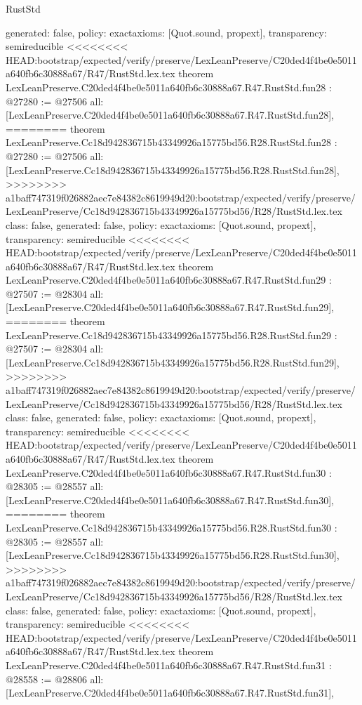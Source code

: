 \begin{lexlean}{RustStd}
\begin{coremodule}
{\begin{coremodule}
{{{{{{{{{{{{{{{{{{{{{{{{{{{{{{{  generated: false,
  policy: exact{axioms: [Quot.sound, propext]},
  transparency: semireducible
}
<<<<<<<< HEAD:bootstrap/expected/verify/preserve/LexLeanPreserve/C20ded4f4be0e5011a640fb6c30888a67/R47/RustStd.lex.tex
theorem LexLeanPreserve.C20ded4f4be0e5011a640fb6c30888a67.R47.RustStd.fun28 : @27280 := @27506 {
  all: [LexLeanPreserve.C20ded4f4be0e5011a640fb6c30888a67.R47.RustStd.fun28],
========
theorem LexLeanPreserve.Cc18d942836715b43349926a15775bd56.R28.RustStd.fun28 : @27280 := @27506 {
  all: [LexLeanPreserve.Cc18d942836715b43349926a15775bd56.R28.RustStd.fun28],
>>>>>>>> a1baff747319f026882aec7e84382c8619949d20:bootstrap/expected/verify/preserve/LexLeanPreserve/Cc18d942836715b43349926a15775bd56/R28/RustStd.lex.tex
  class: false,
  generated: false,
  policy: exact{axioms: [Quot.sound, propext]},
  transparency: semireducible
}
<<<<<<<< HEAD:bootstrap/expected/verify/preserve/LexLeanPreserve/C20ded4f4be0e5011a640fb6c30888a67/R47/RustStd.lex.tex
theorem LexLeanPreserve.C20ded4f4be0e5011a640fb6c30888a67.R47.RustStd.fun29 : @27507 := @28304 {
  all: [LexLeanPreserve.C20ded4f4be0e5011a640fb6c30888a67.R47.RustStd.fun29],
========
theorem LexLeanPreserve.Cc18d942836715b43349926a15775bd56.R28.RustStd.fun29 : @27507 := @28304 {
  all: [LexLeanPreserve.Cc18d942836715b43349926a15775bd56.R28.RustStd.fun29],
>>>>>>>> a1baff747319f026882aec7e84382c8619949d20:bootstrap/expected/verify/preserve/LexLeanPreserve/Cc18d942836715b43349926a15775bd56/R28/RustStd.lex.tex
  class: false,
  generated: false,
  policy: exact{axioms: [Quot.sound, propext]},
  transparency: semireducible
}
<<<<<<<< HEAD:bootstrap/expected/verify/preserve/LexLeanPreserve/C20ded4f4be0e5011a640fb6c30888a67/R47/RustStd.lex.tex
theorem LexLeanPreserve.C20ded4f4be0e5011a640fb6c30888a67.R47.RustStd.fun30 : @28305 := @28557 {
  all: [LexLeanPreserve.C20ded4f4be0e5011a640fb6c30888a67.R47.RustStd.fun30],
========
theorem LexLeanPreserve.Cc18d942836715b43349926a15775bd56.R28.RustStd.fun30 : @28305 := @28557 {
  all: [LexLeanPreserve.Cc18d942836715b43349926a15775bd56.R28.RustStd.fun30],
>>>>>>>> a1baff747319f026882aec7e84382c8619949d20:bootstrap/expected/verify/preserve/LexLeanPreserve/Cc18d942836715b43349926a15775bd56/R28/RustStd.lex.tex
  class: false,
  generated: false,
  policy: exact{axioms: [Quot.sound, propext]},
  transparency: semireducible
}
<<<<<<<< HEAD:bootstrap/expected/verify/preserve/LexLeanPreserve/C20ded4f4be0e5011a640fb6c30888a67/R47/RustStd.lex.tex
theorem LexLeanPreserve.C20ded4f4be0e5011a640fb6c30888a67.R47.RustStd.fun31 : @28558 := @28806 {
  all: [LexLeanPreserve.C20ded4f4be0e5011a640fb6c30888a67.R47.RustStd.fun31],
}}}}}}}}}}}}}}}}}}}}}}}}}}}}}}}}}}
\end{coremodule}}
\end{coremodule}
\end{lexlean}
